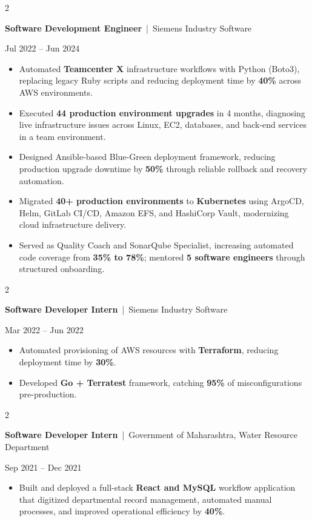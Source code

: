\documentclass[10pt, letterpaper]{article}
\newenvironment{highlights}{
    \begin{itemize}[
        topsep=0.10 cm,
        parsep=0.06 cm,
        partopsep=0pt,
        itemsep=0.06 cm,
        leftmargin=12pt
    ]
}{
    \end{itemize}
}
\newenvironment{twocolentry}[2][]{
    \onecolentry
    \def\secondColumn{#2}
    \setcolumnwidth{\fill, 4.5 cm}
    \begin{paracol}{2}
}{
    \switchcolumn \raggedleft \secondColumn
    \end{paracol}
    \endonecolentry
}
\begin{document}
\vspace{0.15 cm}

\begin{twocolentry}{Jul 2022 -- Jun 2024}
\textbf{Software Development Engineer} \,|\, Siemens Industry Software
\end{twocolentry}
\begin{highlights}
  \item Automated \textbf{Teamcenter X} infrastructure workflows with Python (Boto3), replacing legacy Ruby scripts and reducing deployment time by \textbf{40\%} across AWS environments.
  \item Executed \textbf{44 production environment upgrades} in 4 months, diagnosing live infrastructure issues across Linux, EC2, databases, and back-end services in a team environment.
  \item Designed Ansible-based Blue-Green deployment framework, reducing production upgrade downtime by \textbf{50\%} through reliable rollback and recovery automation.
  \item Migrated \textbf{40+ production environments} to \textbf{Kubernetes} using ArgoCD, Helm, GitLab CI/CD, Amazon EFS, and HashiCorp Vault, modernizing cloud infrastructure delivery.
  \item Served as Quality Coach and SonarQube Specialist, increasing automated code coverage from \textbf{35\% to 78\%}; mentored \textbf{5 software engineers} through structured onboarding.
\end{highlights}

\vspace{0.15 cm}

\begin{twocolentry}{Mar 2022 -- Jun 2022}
\textbf{Software Developer Intern} \,|\, Siemens Industry Software
\end{twocolentry}
\begin{highlights}
  \item Automated provisioning of AWS resources with \textbf{Terraform}, reducing deployment time by \textbf{30\%}.
  \item Developed \textbf{Go + Terratest} framework, catching \textbf{95\%} of misconfigurations pre-production.
\end{highlights}

\vspace{0.15 cm}

\begin{twocolentry}{Sep 2021 -- Dec 2021}
\textbf{Software Developer Intern} \,|\, Government of Maharashtra, Water Resource Department
\end{twocolentry}
\begin{highlights}
  \item Built and deployed a full-stack \textbf{React and MySQL} workflow application that digitized departmental record management, automated manual processes, and improved operational efficiency by \textbf{40\%}.
\end{highlights}
\end{document}
